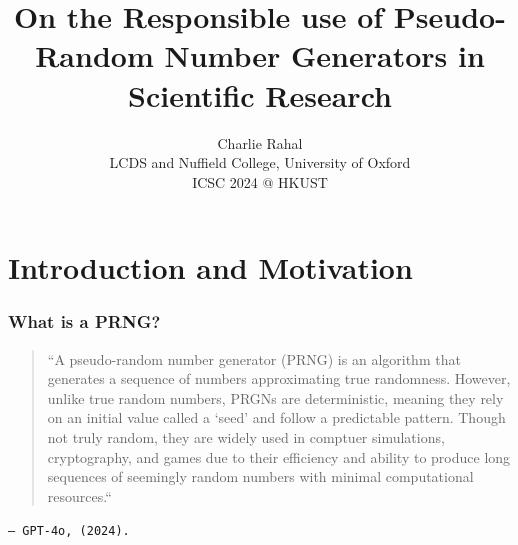 \documentclass[12pt]{beamer}
\begin{document}
\section{Introduction and Motivation}

\title{On the Responsible use of Pseudo-Random Number Generators in Scientific Research} \vspace{-0.25in}
\author{\footnotesize{Charlie Rahal\\ \vspace{0.05in} LCDS and Nuffield College, University of Oxford\\\vspace{.1in}ICSC 2024 @ HKUST}\\ \vspace{-0.15in}}
 \date{}


\begin{frame}
\frametitle{What is a PRNG?}
\begin{center}
\begin{quote}
\begin{scriptsize}
``A pseudo-random number generator (PRNG) is an algorithm that generates a sequence of numbers approximating true randomness. However, unlike true random numbers, PRGNs are deterministic, meaning they rely on an initial value called a `seed' and follow a predictable pattern. Though not truly random, they are widely used in comptuer simulations, cryptography, and games due to their efficiency and ability to produce long sequences of seemingly random numbers with minimal computational resources.``
\end{scriptsize}
\vspace{.4in}
\end{quote}
\begin{small}
\quad \quad \quad \quad \quad \quad \quad \quad \quad \quad \texttt{-- GPT-4o, (2024).}
\end{small}
\end{center}
\end{frame}
\end{document}
